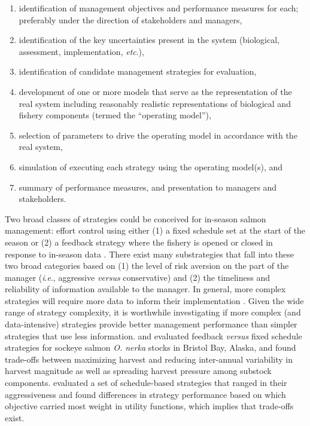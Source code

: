 \documentclass[12pt,]{book}
\theoremstyle{definition}
\theoremstyle{definition}
\theoremstyle{definition}
\theoremstyle{remark}
\begin{document}
\begin{enumerate}
\def\labelenumi{(\arabic{enumi})}
\item
  identification of management objectives and performance measures for
  each; preferably under the direction of stakeholders and managers,
\item
  identification of the key uncertainties present in the system
  (biological, assessment, implementation, \emph{etc}.),
\item
  identification of candidate management strategies for evaluation,
\item
  development of one or more models that serve as the representation of
  the real system including reasonably realistic representations of
  biological and fishery components (termed the ``operating model''),
\item
  selection of parameters to drive the operating model in accordance
  with the real system,
\item
  simulation of executing each strategy using the operating model(s),
  and
\item
  summary of performance measures, and presentation to managers and
  stakeholders.
\end{enumerate}

Two broad classes of strategies could be conceived for in-season salmon
management: effort control using either (1) a fixed schedule set at the
start of the season or (2) a feedback strategy where the fishery is
opened or closed in response to in-season data
\citep[\emph{i}.\emph{e}., management by emergency
order,][]{adkison-cunningham-2015}. There exist many substrategies that
fall into these two broad categories based on (1) the level of risk
aversion on the part of the manager (\emph{i}.\emph{e}., aggressive
\emph{versus} conservative) and (2) the timeliness and reliability of
information available to the manager. In general, more complex
strategies will require more data to inform their implementation
\citep{carney-adkison-2014b}. Given the wide range of strategy
complexity, it is worthwhile investigating if more complex (and
data-intensive) strategies provide better management performance than
simpler strategies that use less information.
\citet{carney-adkison-2014a} and \citet{carney-adkison-2014b} evaluated
feedback \emph{versus} fixed schedule strategies for sockeye salmon
\emph{O. nerka} stocks in Bristol Bay, Alaska, and found trade-offs
between maximizing harvest and reducing inter-annual variability in
harvest magnitude as well as spreading harvest pressure among substock
components. \citet{su-adkison-2002} evaluated a set of schedule-based
strategies that ranged in their aggressiveness and found differences in
strategy performance based on which objective carried most weight in
utility functions, which implies that trade-offs exist.
\end{document}
